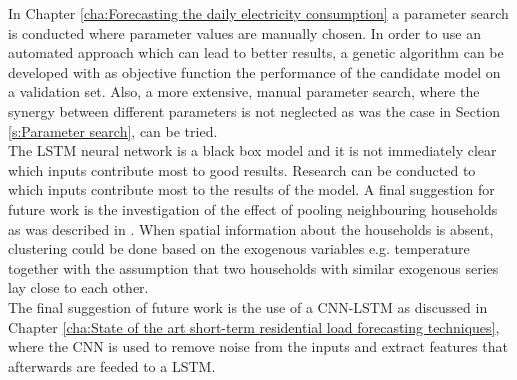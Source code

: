 In Chapter \ref{cha:Forecasting the daily electricity consumption} a parameter search is conducted where parameter values are manually chosen. In order to use an automated approach which can lead to better results, a genetic algorithm can be developed with as objective function the performance of the candidate model on a validation set. Also, a more extensive, manual parameter search, where the synergy between different parameters is not neglected as was the case in Section \ref{s:Parameter search}, can be tried.\\
The LSTM neural network is a black box model and it is not immediately clear which inputs contribute most to good results. Research can be conducted to which inputs contribute most to the results of the model. A final suggestion for future work is the investigation of the effect of pooling neighbouring households as was described in \cite{Shi2018}. When spatial information about the households is absent, clustering could be done based on the exogenous variables e.g. temperature together with the assumption that two households with similar exogenous series lay close to each other. \\

The final suggestion of future work is the use of a CNN-LSTM as discussed in Chapter \ref{cha:State of the art short-term residential load forecasting techniques}, where the CNN is used  to remove noise from the inputs and extract features that afterwards are feeded to a LSTM. 




